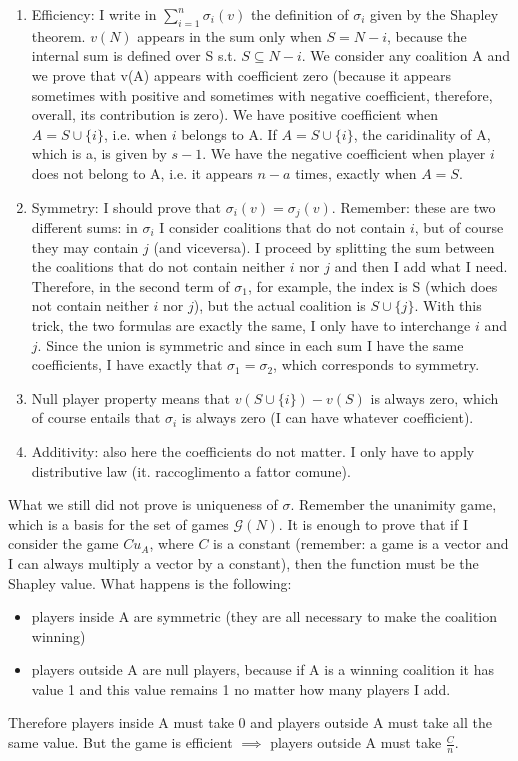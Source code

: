 \documentclass[pt11,a4paper,twoside,reqno,openright]{paper}
\begin{document}
\begin{enumerate}
	\item Efficiency: I write in $\sum_{i=1}^n{\sigma_i(v)}$ the definition 
	of $\sigma_i$ given by the Shapley theorem. $v(N)$ appears in the sum 
	only when $S = N - {i}$, because the internal sum is defined over S s.t. 
	$S \subseteq N - {i}$. 
	We consider any coalition A and we prove that v(A) appears with coefficient 
	zero (because it appears sometimes with positive and sometimes with negative 
	coefficient, therefore, overall, its contribution is zero). 
	We have positive coefficient when $A = S \cup \{i\}$, i.e. when $i$ belongs 
	to A. If $A = S \cup \{i\}$, the caridinality of A, which is a, is 
	given by $s-1$. 
	We have the negative coefficient when player $i$ does not belong to A, i.e. 
	it appears $n-a$ times, exactly when $A = S$.

	\item Symmetry: I should prove that $\sigma_i(v) = \sigma_j(v)$. 
	Remember: these are two different sums: in $\sigma_i$ I consider coalitions 
	that do not contain $i$, but of course they may contain $j$ (and viceversa). 
	I proceed by splitting the sum between the coalitions that do not contain 
	neither $i$ nor $j$ and then I add what I need. Therefore, in the second 
	term of $\sigma_1$, for example, the index is S (which does not contain 
	neither $i$ nor $j$), but the actual coalition is $S \cup \{j\}$. 
	With this trick, the two formulas are exactly the same, I only have to 
	interchange $i$ and $j$. Since the union is symmetric and since in each 
	sum I have the same coefficients, I have exactly that $\sigma_1 = \sigma_2$, 
	which corresponds to symmetry.

	\item Null player property means that $v(S \cup \{i\}) - v(S)$ is always 
	zero, which of course entails that $\sigma_i$ is always zero (I can have 
	whatever coefficient).

	\item Additivity: also here the coefficients do not matter. I only have to 
	apply distributive law (it. raccoglimento a fattor comune).
\end{enumerate}

\noindent What we still did not prove is uniqueness of $\sigma$. Remember the 
unanimity game, which is a basis for the set of games $\mathcal{G}(N)$. It is 
enough to prove that if I consider the game $Cu_A$, where $C$ is a constant 
(remember: a game is a vector and I can always multiply a vector by a 
constant), then the function must be the Shapley value. 
What happens is the following:
\begin{itemize}
	\item players inside A are symmetric (they are all necessary to make 
	the coalition winning)

	\item players outside A are null players, because if A is a winning 
	coalition it has value 1 and this value remains 1 no matter how many 
	players I add.
\end{itemize}
Therefore players inside A must take 0 and players outside A must take all the 
same value. But the game is efficient $\implies$ players outside A must take 
$\frac{C}{n}$.
\end{document}
